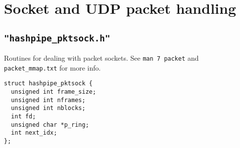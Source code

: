 \documentclass[12pt]{article}
\begin{document}
\section{Socket and UDP packet handling}

\subsection{\tt "hashpipe\_pktsock.h"}

 Routines for dealing with packet sockets. See {\tt man 7 packet} and 
{\tt packet\_mmap.txt} for more info.

\begin{center}
\begin{lstlisting}
struct hashpipe_pktsock {
  unsigned int frame_size;
  unsigned int nframes;
  unsigned int nblocks;
  int fd;
  unsigned char *p_ring;
  int next_idx;
};
\end{lstlisting}
\end{center}
\end{document}
